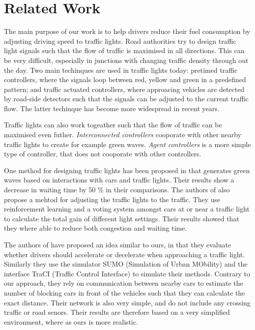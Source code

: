 \section{Related Work}

The main purpose of our work is to help drivers reduce their fuel consumption by adjusting driving speed to traffic lights.
Road authorities try to design traffic light signals such that the flow of traffic is maximised in all directions.
This can be very difficult, especially in junctions with changing traffic density through out the day.
Two main techinques are used in traffic lights today: pretimed traffic controllers, where the signals loop between red, yellow and green in a predefined pattern; and traffic actuated controllers, where approacing vehicles are detected by road-side detectors such that the signals can be adjusted to the current traffic flow.
The latter techinque has become more widespread in recent years. %

Traffic lights can also work togeather such that the flow of traffic can be maximised even futher. 
\textit{Interconnected controllers} cooporate with other nearby traffic lights to create for example green waves.
\textit{Agent controllers} is a more simple type of controller, that does not cooporate with other controllers.

One method for designing traffic lights has been proposed in \cite{SOTL} that generates green waves based on interactions with cars and traffic lights. Their results show a decrease in waiting time by 50 \% in their comparisons.
The authors of \cite{ITLC} also propose a mehtod for adjusting the traffic lights to the traffic. They use reinforcement learning and a voting system amongst cars at or near a traffic light to calculate the total gain of different light settings. Their results showed that they where able to reduce both congestion and waiting time.

The authors of \cite{VANETsim} have proposed an idea similar to ours, in that they evaluate whether drivers should accelerate or decelerate when approaching a traffic light.
Similarly they use the simulator SUMO (Simulation of Urban MObility) and the interface TraCI (Traffic Control Interface) to simulate their methods. 
Contrary to our approach, they rely on communication between nearby cars to estimate the number of blocking cars in front of the vehicles such that they can calculate the exact distance.
Their network is also very simple, and do not include any crossing traffic or road senors. 
Their results are therefore based on a very simplified environment, where as ours is more realistic.

